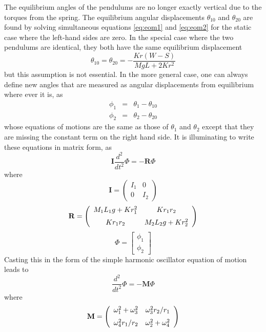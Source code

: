 \documentclass{revtex4}
\begin{document}
The equilibrium angles of the pendulums are no longer exactly vertical
due to the torques from the spring.  The equilibrium angular displacements
$\theta_{10}$ and $\theta_{20}$ are found by solving simultaneous
equations \ref{eq:eom1} and \ref{eq:eom2} for the static case where the
left-hand sides are zero.  In the special case where the two pendulums are
identical, they both have the same equilibrium displacement
\begin{equation}
\theta_{10} = \theta_{20} = -\frac{Kr(W-S)}{MgL+2Kr^2}
\end{equation}
but this assumption is not essential.  In the more general case, one
can always define new angles that are measured as angular displacements
from equilibrium where ever it is, as
\begin{eqnarray}
\phi_1 &=& \theta_1-\theta_{10} \nonumber \\
\phi_2 &=& \theta_2-\theta_{20} \nonumber
\end{eqnarray}
whose equations of motions are the same as those of $\theta_1$ and
$\theta_2$ except that they are missing the constant term on the right
hand side.  It is illuminating to write these equations in matrix form,
as
\begin{equation}
{\mathbf I} \frac{d^2}{dt^2} \Phi = -{\mathbf R} \Phi
\end{equation}
where
\[ {\mathbf I} = \left(
\begin{array}{cc}
I_1 & 0 \\
0 & I_2
\end{array}
\right) \]
\[ {\mathbf R} = \left(
\begin{array}{cc}
M_1L_1g+Kr_1^2 & Kr_1r_2 \vspace*{2mm} \\
Kr_1r_2 & M_2L_2g+Kr_2^2
\end{array}
\right) \]
\[ \Phi = \left[
\begin{array}{cc}
\phi_1 \\
\phi_2
\end{array}
\right] \]
Casting this in the form of the simple harmonic oscillator equation
of motion leads to 
\begin{equation}
\frac{d^2}{dt^2} \Phi = -{\mathbf M} \Phi \label{eq:eom4phi}
\end{equation}
where
\begin{equation}
{\mathbf M} = \left(
\begin{array}{cc}
\omega_1^2+\omega_3^2 & \omega_3^2r_2/r_1 \vspace*{2mm} \\
\omega_4^2r_1/r_2 & \omega_2^2+\omega_4^2
\end{array}
\right)
\end{equation}
\end{document}
